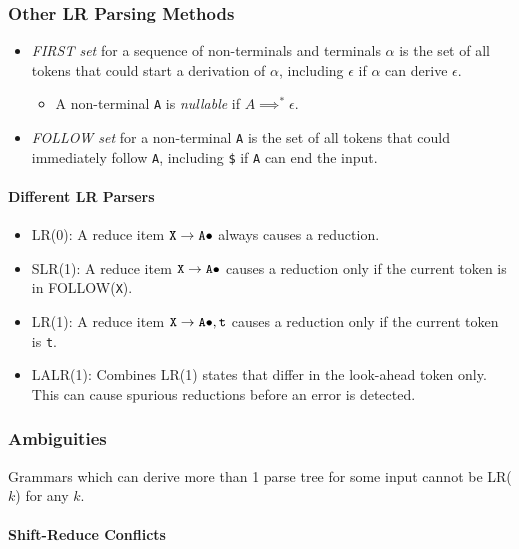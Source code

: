 \documentclass[twocolumn,english]{article}
\begin{document}
\subsubsection{Other LR Parsing Methods}
\begin{itemize}
\item \emph{FIRST set} for a sequence of non-terminals and terminals $\alpha$
is the set of all tokens that could start a derivation of $\alpha$,
including $\epsilon$ if $\alpha$ can derive $\epsilon$.
\begin{itemize}
\item A non-terminal \texttt{A} is \emph{nullable} if $A\implies^{*}\epsilon$.
\end{itemize}
\item \emph{FOLLOW set} for a non-terminal \texttt{A} is the set of all
tokens that could immediately follow \texttt{A}, including \texttt{\$}
if \texttt{A} can end the input.
\end{itemize}

\paragraph{Different LR Parsers}
\begin{itemize}
\item LR(0): A reduce item $\texttt{X}\rightarrow\texttt{A\ensuremath{\bullet}}$
always causes a reduction.
\item SLR(1): A reduce item $\texttt{X}\rightarrow\texttt{A\ensuremath{\bullet}}$
causes a reduction only if the current token is in FOLLOW(\texttt{X}).
\item LR(1): A reduce item $\texttt{X}\rightarrow\texttt{A\ensuremath{\bullet}},\texttt{t}$
causes a reduction only if the current token is \texttt{t}.
\item LALR(1): Combines LR(1) states that differ in the look-ahead token
only. This can cause spurious reductions before an error is detected.
\end{itemize}

\subsubsection{Ambiguities}

Grammars which can derive more than 1 parse tree for some input cannot
be LR($k$) for any $k$.

\paragraph{Shift-Reduce Conflicts}
\end{document}
